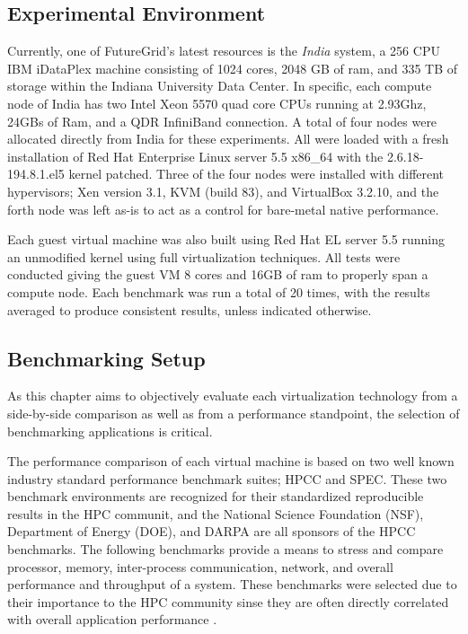 \subsection{Experimental Environment}

Currently, one of FutureGrid's latest resources is the {\it India} system, a 256 CPU IBM iDataPlex machine consisting of 1024 cores, 2048 GB of ram, and 335 TB of storage within the Indiana University Data Center.  In specific, each compute node of India has two Intel Xeon 5570 quad core CPUs running at 2.93Ghz, 24GBs of Ram, and a QDR InfiniBand connection.  A total of four nodes were allocated directly from India for these experiments.  All were loaded with a fresh installation of Red Hat Enterprise Linux server 5.5 x86\_64 with the 2.6.18-194.8.1.el5 kernel patched. Three of the four nodes were installed with different hypervisors; Xen version 3.1, KVM (build 83), and VirtualBox 3.2.10, and the forth node was left as-is to act as a control for bare-metal native performance.  

Each guest virtual machine was also built using Red Hat EL server 5.5 running an unmodified kernel using full virtualization techniques.  All tests were conducted giving the guest VM 8 cores and 16GB of ram to properly span a compute node.  Each benchmark was run a total of 20 times, with the results averaged to produce consistent results, unless indicated otherwise.


\subsection{Benchmarking Setup}

As this chapter aims to objectively evaluate each virtualization technology from a side-by-side comparison as well as from a performance standpoint, the selection of benchmarking applications is critical.  

The performance comparison of each virtual machine is based on two well known industry standard performance benchmark suites; HPCC and  SPEC. These two benchmark environments are recognized for their standardized reproducible results in the HPC communit, and the National Science Foundation (NSF), Department of Energy (DOE), and DARPA are all sponsors of the HPCC benchmarks. The following benchmarks provide a means to stress and compare processor, memory, inter-process communication, network, and overall performance and throughput of a system.  These benchmarks were selected due to their importance to the HPC community sinse they are often directly correlated with overall application performance \cite{Dujmovic1998}. 
 


